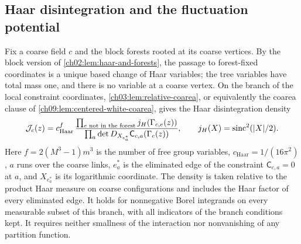 \subsection{Haar disintegration and the fluctuation potential}

Fix a coarse field $c$ and the block forests rooted at its coarse vertices. By the block version of \cref{ch02:lem:haar-and-forests}, the passage to forest-fixed coordinates is a unique based change of Haar variables; the tree variables have total mass one, and there is no variable at a coarse vertex. On the branch of the local constraint coordinates, \cref{ch03:lem:relative-coarea}, or equivalently the coarea clause of \cref{ch09:lem:centered-white-coarea}, gives the Haar disintegration density
\begin{equation}\label{ch11:eq:one-shell-coarea}
 \mathcal J_c(z)=c_{\mathrm{Haar}}^{f}\,
 \frac{\prod_{e\text{ not in the forest}}j_H(\Gamma_{c,e}(z))}
 {\prod_a\det D_{X_{e^*_a}}\mathsf C_{c,a}(\Gamma_c(z))},
 \qquad j_H(X)=\operatorname{sinc}^2(\lvert X\rvert/2).
\end{equation}
Here $f=2(M^3-1)m^3$ is the number of free group variables, $c_{\mathrm{Haar}}=1/(16\pi^2)$, $a$ runs over the coarse links, $e^*_a$ is the eliminated edge of the constraint $\mathsf C_{c,a}=0$ at $a$, and $X_{e^*_a}$ is its logarithmic coordinate. The density is taken relative to the product Haar measure on coarse configurations and includes the Haar factor of every eliminated edge. It holds for nonnegative Borel integrands on every measurable subset of this branch, with all indicators of the branch conditions kept. It requires neither smallness of the interaction nor nonvanishing of any partition function.

